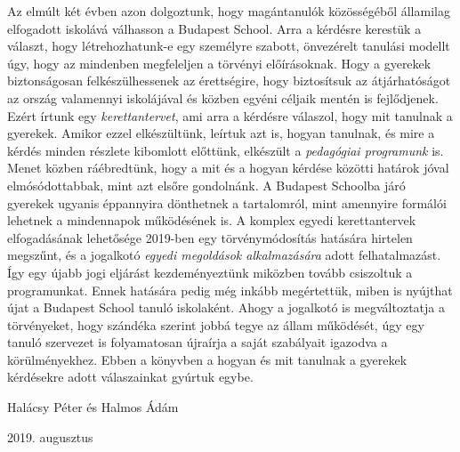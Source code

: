 Az elmúlt két évben azon dolgoztunk, hogy magántanulók közösségéből államilag elfogadott iskolává válhasson a Budapest School. Arra a kérdésre kerestük a választ, hogy létrehozhatunk-e egy személyre szabott, önvezérelt tanulási modellt úgy, hogy az mindenben megfeleljen a törvényi előírásoknak. Hogy a gyerekek biztonságosan felkészülhessenek az érettségire, hogy biztosítsuk az átjárhatóságot az ország valamennyi iskolájával és közben egyéni céljaik mentén is fejlődjenek. Ezért írtunk egy \emph{kerettantervet}, ami arra a kérdésre válaszol, hogy mit tanulnak a gyerekek. Amikor ezzel elkészültünk, leírtuk azt is, hogyan tanulnak, és mire a kérdés minden részlete kibomlott előttünk, elkészült a \emph{pedagógiai programunk} is. Menet közben ráébredtünk, hogy a mit és a hogyan kérdése közötti határok jóval elmósódottabbak, mint azt elsőre gondolnánk. A Budapest Schoolba járó gyerekek ugyanis éppannyira dönthetnek a tartalomról, mint amennyire formálói lehetnek a mindennapok működésének is. A komplex egyedi kerettantervek elfogadásának lehetősége 2019-ben egy törvénymódosítás hatására hirtelen megszűnt, és a jogalkotó  \emph{egyedi megoldások alkalmazására} adott felhatalmazást. Így egy újabb jogi eljárást kezdeményeztünk miközben tovább csiszoltuk a programunkat. Ennek hatására pedig még inkább megértettük, miben is nyújthat újat a Budapest School tanuló iskolaként. Ahogy a jogalkotó is megváltoztatja a törvényeket, hogy szándéka szerint jobbá tegye az állam működését, úgy egy tanuló szervezet is folyamatosan újraírja a saját szabályait igazodva a körülményekhez. Ebben a könyvben a hogyan és mit tanulnak a gyerekek kérdésekre adott válaszainkat gyúrtuk egybe.       


\bigskip
{
\raggedright Halácsy Péter és Halmos Ádám\\
\raggedright 2019. augusztus
}